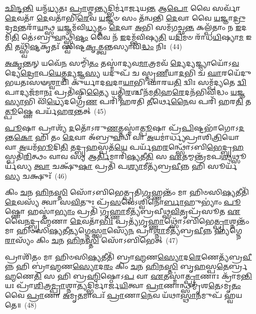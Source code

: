 \-\ul{𑌛𑌿}\-\-\ul{𑌨𑍍𑌦}\-\-\ul{𑌨𑍍𑌤𑌿} 𑌯𑌨𑍍𑌮᳴\-\ul{𑌧𑍍𑌯}\-𑌤𑌃 \ul{𑌪𑍍𑌰𑌾}\-𑌶𑍍𑌨\-\ul{𑌨𑍍𑌤𑍍𑌯}\-𑌦𑍍𑌭𑌿𑌰𑍍𑌮𑌾॑𑌰𑍍𑌜𑌯\-\ul{𑌨𑍍𑌤} 𑌆\-\ul{𑌪𑍋} 𑌵𑍈 𑌸𑌰𑍍𑌵𑌾᳴ \ul{𑌦𑍇}\-𑌵𑌤𑌾᳴ \ul{𑌦𑍇}\-𑌵𑌤𑌾᳴𑌭𑌿\-\ul{𑌰𑍇}\-𑌵 \ul{𑌯}\-𑌜𑍍𑌞𑍞 𑌸𑌂 𑌤᳴𑌨𑍍𑌵𑌨𑍍𑌤𑌿 \ul{𑌦𑍇}\-𑌵𑌾 𑌵𑍈 \ul{𑌯}\-𑌜𑍍𑌞𑌾\-\ul{𑌦𑍍𑌰𑍁}\-𑌦𑍍𑌰\-\ul{𑌮}\-𑌨𑍍𑌤𑌰𑌾᳴\-\ul{𑌯}\-𑌨𑍍𑌥𑍍𑌸 \ul{𑌯}\-𑌜𑍍𑌞𑌮᳴𑌵𑌿\-\ul{𑌧𑍍𑌯}\-𑌤𑍍𑌤𑌂 \ul{𑌦𑍇}\-𑌵𑌾 \ul{𑌅}\-𑌭𑌿 𑌸𑌮᳴𑌗𑌚𑍍𑌛\-\ul{𑌨𑍍𑌤} 𑌕𑌲𑍍𑌪᳴𑌤𑌾𑌂 𑌨 \ul{𑌇}\-𑌦𑌮𑌿\-\ul{𑌤𑌿} 𑌤𑍇॑\-𑌽𑌬𑍍𑌰𑍁\-\ul{𑌵}\-𑌨𑍍𑌥𑍍𑌸𑍍𑌵𑌿᳴\-\ul{𑌷𑍍𑌟𑌂} 𑌵𑍈 𑌨᳴ \ul{𑌇}\-𑌦𑌮𑍍𑌭᳴𑌵𑌿𑌷𑍍𑌯\-\ul{𑌤𑌿} 𑌯\-\ul{𑌦𑌿}\-𑌮𑍞 𑌰𑌾᳴𑌧\-\ul{𑌯𑌿}\-𑌷𑍍𑌯𑌾\-\ul{𑌮} 𑌇\-\ul{𑌤𑌿} 𑌤𑌥𑍍𑌸𑍍𑌵𑌿᳴\-\ul{𑌷𑍍𑌟}\-𑌕𑍃𑌤𑌃᳴ 𑌸𑍍𑌵𑌿𑌷𑍍𑌟\-\ul{𑌕𑍃}\-𑌤𑍍𑌤𑍍𑌵𑌨𑍍𑌤𑌸𑍍𑌯𑌾𑌵𑌿᳴\-\ul{𑌦𑍍𑌧𑌂} 𑌨𑌿𑌃~(44)

\-\ul{𑌅}\-\-\ul{𑌕𑍃}\-\-\ul{𑌨𑍍𑌤}\-𑌨𑍍 𑌯𑌵𑍇᳴\-\ul{𑌨} 𑌸𑌮𑍍𑌮𑌿᳴\-\ul{𑌤𑌂} 𑌤𑌸𑍍𑌮𑌾॑𑌦𑍍𑌯𑌵\-\ul{𑌮𑌾}\-𑌤𑍍𑌰𑌮𑌵᳴ \ul{𑌦𑍍𑌯𑍇}\-𑌦𑍍𑌯𑌜𑍍𑌜𑍍𑌯𑌾𑌯𑍋᳴\-𑌽\-\ul{𑌵}\-𑌦𑍍𑌯𑍇\-\ul{𑌦𑍍𑌰𑍋}\-𑌪\-\ul{𑌯𑍇}\-𑌤𑍍𑌤\-\ul{𑌦𑍍𑌯}\-𑌜𑍍𑌞\-\ul{𑌸𑍍𑌯} 𑌯𑌦𑍁𑌪᳴ 𑌚 𑌸𑍍𑌤𑍃\-\ul{𑌣𑍀}\-𑌯𑌾\-\ul{𑌦}\-𑌭𑌿 𑌚᳴ \ul{𑌘𑌾}\-𑌰𑌯𑍇᳴𑌦𑍁𑌭𑌯𑌤𑌃𑌸𑍟\-\ul{𑌶𑍍𑌵𑌾}\-𑌯𑌿 𑌕𑍁᳴𑌰𑍍𑌯𑌾𑌦\-\ul{𑌵}\-𑌦𑌾\-\ul{𑌯𑌾}\-𑌭𑌿 𑌘𑌾᳴𑌰𑌯\-\ul{𑌤𑌿} 𑌦𑍍𑌵𑌿𑌃 𑌸𑌮𑍍𑌪᳴𑌦𑍍𑌯𑌤𑍇 \ul{𑌦𑍍𑌵𑌿}\-𑌪𑌾𑌦𑍍𑌯𑌜᳴𑌮𑌾\-\ul{𑌨𑌃} 𑌪𑍍𑌰𑌤𑌿᳴𑌷𑍍𑌠𑌿\-\ul{𑌤𑍍𑌯𑍈} 𑌯𑌤𑍍𑌤𑌿᳴\-\ul{𑌰}\-𑌶𑍍𑌚𑍀𑌨᳴𑌮\-\ul{𑌤𑌿}\-𑌹\-\ul{𑌰𑍇}\-𑌦𑌨᳴𑌭𑌿𑌵𑌿𑌦𑍍𑌧𑌂 \ul{𑌯}\-𑌜𑍍𑌞\-\ul{𑌸𑍍𑌯𑌾}\-𑌭𑌿 𑌵𑌿᳴\-\ul{𑌧𑍍𑌯𑍇}\-𑌦𑌗𑍍𑌰𑍇᳴\-\ul{𑌣} 𑌪𑌰𑌿᳴ 𑌹𑌰𑌤𑌿 \ul{𑌤𑍀}\-𑌰𑍍𑌥𑍇\-\ul{𑌨𑍈}\-𑌵 𑌪𑌰𑌿᳴ 𑌹𑌰\-\ul{𑌤𑌿} 𑌤\-\ul{𑌤𑍍𑌪𑍂}\-𑌷𑍍𑌣𑍇 𑌪𑌰𑍍𑌯᳴𑌹\-\ul{𑌰}\-𑌨𑍍𑌤𑌤𑍍~(45)

\-\ul{𑌪𑍂}\-𑌷𑌾 𑌪𑍍𑌰𑌾𑌶𑍍𑌯᳴ \ul{𑌦}\-𑌤𑍋᳴\-𑌽𑌰𑍁\-\ul{𑌣}\-𑌤𑍍𑌤𑌸𑍍𑌮𑌾॑\-\ul{𑌤𑍍𑌪𑍂}\-𑌷𑌾 𑌪𑍍𑌰᳴\-\ul{𑌪𑌿}\-𑌷𑍍𑌟𑌭𑌾᳴𑌗𑍋\-𑌽\-\ul{𑌦}\-𑌨𑍍𑌤\-\ul{𑌕𑍋} 𑌹𑌿 𑌤𑌂 \ul{𑌦𑍇}\-𑌵𑌾 𑌅᳴𑌬𑍍𑌰𑍁\-\ul{𑌵}\-𑌨𑍍𑌵𑌿 𑌵𑌾 \ul{𑌅}\-𑌯𑌮𑌾॑𑌰𑍍𑌧𑍍𑌯𑌪𑍍𑌰𑌾𑌶𑌿\-\ul{𑌤𑍍𑌰𑌿}\-𑌯𑍋 𑌵𑌾 \ul{𑌅}\-𑌯𑌮᳴\-\ul{𑌭𑍂}\-𑌦𑌿\-\ul{𑌤𑌿} 𑌤𑌦𑍍𑌬𑍃\-\ul{𑌹}\-𑌸𑍍𑌪𑌤᳴\-\ul{𑌯𑍇} 𑌪𑌰𑍍𑌯᳴𑌹\-\ul{𑌰}\-𑌨𑍍𑌥𑍍𑌸𑍋᳴\-𑌽𑌬𑌿\-\ul{𑌭𑍇}\-𑌦𑍍𑌬𑍃\-\ul{𑌹}\-𑌸𑍍𑌪𑌤𑌿᳴\-\ul{𑌰𑌿}\-𑌤𑍍𑌥𑌂 𑌵𑌾𑌵 𑌸𑍍𑌯 𑌆\-\ul{𑌰𑍍𑌤𑌿}\-𑌮𑌾𑌰𑌿᳴\-\ul{𑌷𑍍𑌯}\-𑌤𑍀\-\ul{𑌤𑌿} 𑌸 \ul{𑌏}\-𑌤𑌮𑍍𑌮𑌨𑍍𑌤𑍍𑌰᳴𑌮𑌪\-\ul{𑌶𑍍𑌯}\-𑌥𑍍𑌸𑍂𑌰𑍍𑌯᳴𑌸𑍍𑌯 \ul{𑌤𑍍𑌵𑌾} 𑌚𑌕𑍍𑌷𑍁᳴\-\ul{𑌷𑌾} 𑌪𑍍𑌰𑌤𑌿᳴ 𑌪\-\ul{𑌶𑍍𑌯𑌾}\-𑌮𑍀𑌤𑍍𑌯᳴𑌬𑍍𑌰\-\ul{𑌵𑍀}\-𑌨𑍍𑌨 𑌹𑌿 𑌸𑍂𑌰𑍍𑌯᳴\-\ul{𑌸𑍍𑌯} 𑌚𑌕𑍍𑌷𑍁𑌃᳴~(46)

𑌕𑌿𑌂 \ul{𑌚}\-𑌨 \ul{𑌹𑌿}\-𑌨\-\ul{𑌸𑍍𑌤𑌿} 𑌸𑍋᳴\-𑌽𑌬𑌿𑌭𑍇𑌤𑍍𑌪𑍍𑌰𑌤𑌿\-\ul{𑌗𑍃}\-𑌹𑍍𑌣𑌨𑍍𑌤𑌂᳴ 𑌮𑌾 𑌹𑌿𑍞𑌸𑌿\-\ul{𑌷𑍍𑌯}\-𑌤𑍀𑌤𑌿᳴ \ul{𑌦𑍇}\-𑌵𑌸𑍍𑌯᳴ 𑌤𑍍𑌵𑌾 𑌸\-\ul{𑌵𑌿}\-𑌤𑍁𑌃 𑌪𑍍𑌰᳴\-\ul{𑌸}\-𑌵𑍇॑\-𑌽𑌶𑍍𑌵𑌿𑌨𑍋॑\-\ul{𑌰𑍍𑌬𑌾}\-𑌹𑍁\-𑌭𑍍𑌯𑌾𑌂॑ \ul{𑌪𑍂}\-𑌷𑍍𑌣𑍋 𑌹𑌸𑍍𑌤𑌾॑\-\ul{𑌭𑍍𑌯𑌾𑌂} 𑌪𑍍𑌰𑌤𑌿᳴ 𑌗𑍃\-\ul{𑌹𑍍𑌣𑌾}\-𑌮𑍀𑌤𑍍𑌯᳴𑌬𑍍𑌰𑌵𑍀𑌥𑍍𑌸\-\ul{𑌵𑌿}\-𑌤𑍃𑌪𑍍𑌰᳴𑌸𑍂𑌤 \ul{𑌏}\-𑌵𑍈\-\ul{𑌨}\-𑌦𑍍𑌬𑍍𑌰𑌹𑍍𑌮᳴𑌣𑌾 \ul{𑌦𑍇}\-𑌵𑌤𑌾᳴\-\ul{𑌭𑌿𑌃} 𑌪𑍍𑌰𑌤𑍍𑌯᳴𑌗𑍃\-\ul{𑌹𑍍𑌣𑌾}\-𑌥𑍍𑌸𑍋᳴\-𑌽𑌬𑌿𑌭𑍇\-\ul{𑌤𑍍𑌪𑍍𑌰𑌾}\-𑌶𑍍𑌨𑌨𑍍𑌤𑌂᳴ 𑌮𑌾 𑌹𑌿𑍞𑌸𑌿\-\ul{𑌷𑍍𑌯}\-𑌤𑍀\-\ul{𑌤𑍍𑌯}\-𑌗𑍍𑌨𑍇\-\ul{𑌸𑍍𑌤𑍍𑌵𑌾}\-𑌸𑍍𑌯𑍇᳴\-\ul{𑌨} 𑌪𑍍𑌰𑌾\-\ul{𑌶𑍍𑌨𑌾}\-𑌮𑍀𑌤𑍍𑌯᳴𑌬𑍍𑌰\-\ul{𑌵𑍀}\-𑌨𑍍𑌨 𑌹𑍍𑌯᳴𑌗𑍍𑌨𑍇\-\ul{𑌰𑌾}\-𑌸𑍍𑌯𑌂᳴ 𑌕𑌿𑌂 \ul{𑌚}\-𑌨 \ul{𑌹𑌿}\-𑌨\-\ul{𑌸𑍍𑌤𑌿} 𑌸𑍋᳴\-𑌽𑌬𑌿𑌭𑍇𑌤𑍍~(47)

𑌪𑍍𑌰𑌾𑌶𑌿᳴𑌤𑌂 𑌮𑌾 𑌹𑌿𑍞𑌸𑌿\-\ul{𑌷𑍍𑌯}\-𑌤𑍀𑌤𑌿᳴ 𑌬𑍍𑌰𑌾\-\ul{𑌹𑍍𑌮}\-𑌣\-\ul{𑌸𑍍𑌯𑍋}\-𑌦\-\ul{𑌰𑍇}\-𑌣𑍇𑌤𑍍𑌯᳴𑌬𑍍𑌰\-\ul{𑌵𑍀}\-𑌨𑍍𑌨 𑌹𑌿 𑌬𑍍𑌰𑌾॑\-\ul{𑌹𑍍𑌮}\-𑌣\-\ul{𑌸𑍍𑌯𑍋}\-𑌦\-\ul{𑌰𑌂} 𑌕𑌿𑌂 \ul{𑌚}\-𑌨 \ul{𑌹𑌿}\-𑌨\-\ul{𑌸𑍍𑌤𑌿} 𑌬𑍃\-\ul{𑌹}\-𑌸𑍍𑌪\-\ul{𑌤𑍇}\-𑌰𑍍𑌬𑍍𑌰\-\ul{𑌹𑍍𑌮}\-𑌣𑍇\-\ul{𑌤𑌿} 𑌸 𑌹𑌿 𑌬𑍍𑌰\-\ul{𑌹𑍍𑌮𑌿}\-𑌷𑍍𑌠𑍋\-𑌽\-\ul{𑌪} 𑌵𑌾 \ul{𑌏}\-𑌤𑌸𑍍𑌮𑌾॑\-\ul{𑌤𑍍𑌪𑍍𑌰𑌾}\-𑌣𑌾𑌃 𑌕𑍍𑌰𑌾᳴𑌮\-\ul{𑌨𑍍𑌤𑌿} 𑌯𑌃 𑌪𑍍𑌰𑌾᳴\-\ul{𑌶𑌿}\-𑌤𑍍𑌰\-\ul{𑌮𑍍𑌪𑍍𑌰𑌾}\-𑌶𑍍𑌨𑌾\-\ul{𑌤𑍍𑌯}\-𑌦𑍍𑌭𑌿𑌰𑍍𑌮𑌾॑𑌰𑍍𑌜\-\ul{𑌯𑌿}\-𑌤𑍍𑌵𑌾 \ul{𑌪𑍍𑌰𑌾}\-𑌣𑌾𑌨𑍍𑌥𑍍𑌸𑌮𑍍𑌮𑍃᳴𑌶\-\ul{𑌤𑍇}\-\-𑌽𑌮𑍃\-\ul{𑌤𑌂} 𑌵𑍈 \ul{𑌪𑍍𑌰𑌾}\-𑌣𑌾 \ul{𑌅}\-𑌮𑍃\-\ul{𑌤}\-𑌮𑌾𑌪𑌃᳴ \ul{𑌪𑍍𑌰𑌾}\-𑌣𑌾\-\ul{𑌨𑍇}\-𑌵 𑌯᳴𑌥𑌾\-\ul{𑌸𑍍𑌥𑌾}\-𑌨𑌮𑍁𑌪᳴ 𑌹𑍍𑌵𑌯𑌤𑍇॥~(48)

